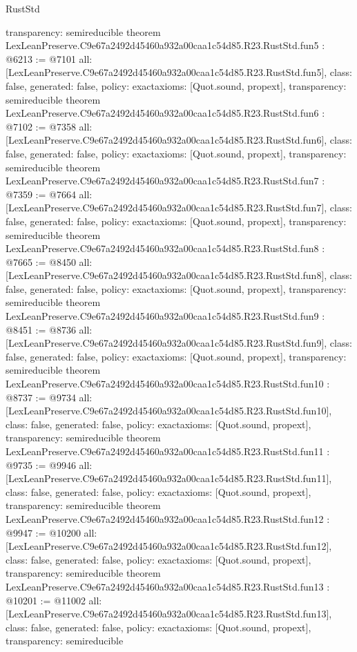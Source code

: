 \begin{lexlean}{RustStd}
\begin{coremodule}
{  transparency: semireducible
}
theorem LexLeanPreserve.C9e67a2492d45460a932a00caa1c54d85.R23.RustStd.fun5 : @6213 := @7101 {
  all: [LexLeanPreserve.C9e67a2492d45460a932a00caa1c54d85.R23.RustStd.fun5],
  class: false,
  generated: false,
  policy: exact{axioms: [Quot.sound, propext]},
  transparency: semireducible
}
theorem LexLeanPreserve.C9e67a2492d45460a932a00caa1c54d85.R23.RustStd.fun6 : @7102 := @7358 {
  all: [LexLeanPreserve.C9e67a2492d45460a932a00caa1c54d85.R23.RustStd.fun6],
  class: false,
  generated: false,
  policy: exact{axioms: [Quot.sound, propext]},
  transparency: semireducible
}
theorem LexLeanPreserve.C9e67a2492d45460a932a00caa1c54d85.R23.RustStd.fun7 : @7359 := @7664 {
  all: [LexLeanPreserve.C9e67a2492d45460a932a00caa1c54d85.R23.RustStd.fun7],
  class: false,
  generated: false,
  policy: exact{axioms: [Quot.sound, propext]},
  transparency: semireducible
}
theorem LexLeanPreserve.C9e67a2492d45460a932a00caa1c54d85.R23.RustStd.fun8 : @7665 := @8450 {
  all: [LexLeanPreserve.C9e67a2492d45460a932a00caa1c54d85.R23.RustStd.fun8],
  class: false,
  generated: false,
  policy: exact{axioms: [Quot.sound, propext]},
  transparency: semireducible
}
theorem LexLeanPreserve.C9e67a2492d45460a932a00caa1c54d85.R23.RustStd.fun9 : @8451 := @8736 {
  all: [LexLeanPreserve.C9e67a2492d45460a932a00caa1c54d85.R23.RustStd.fun9],
  class: false,
  generated: false,
  policy: exact{axioms: [Quot.sound, propext]},
  transparency: semireducible
}
theorem LexLeanPreserve.C9e67a2492d45460a932a00caa1c54d85.R23.RustStd.fun10 : @8737 := @9734 {
  all: [LexLeanPreserve.C9e67a2492d45460a932a00caa1c54d85.R23.RustStd.fun10],
  class: false,
  generated: false,
  policy: exact{axioms: [Quot.sound, propext]},
  transparency: semireducible
}
theorem LexLeanPreserve.C9e67a2492d45460a932a00caa1c54d85.R23.RustStd.fun11 : @9735 := @9946 {
  all: [LexLeanPreserve.C9e67a2492d45460a932a00caa1c54d85.R23.RustStd.fun11],
  class: false,
  generated: false,
  policy: exact{axioms: [Quot.sound, propext]},
  transparency: semireducible
}
theorem LexLeanPreserve.C9e67a2492d45460a932a00caa1c54d85.R23.RustStd.fun12 : @9947 := @10200 {
  all: [LexLeanPreserve.C9e67a2492d45460a932a00caa1c54d85.R23.RustStd.fun12],
  class: false,
  generated: false,
  policy: exact{axioms: [Quot.sound, propext]},
  transparency: semireducible
}
theorem LexLeanPreserve.C9e67a2492d45460a932a00caa1c54d85.R23.RustStd.fun13 : @10201 := @11002 {
  all: [LexLeanPreserve.C9e67a2492d45460a932a00caa1c54d85.R23.RustStd.fun13],
  class: false,
  generated: false,
  policy: exact{axioms: [Quot.sound, propext]},
  transparency: semireducible
}
\end{coremodule}
\end{lexlean}
